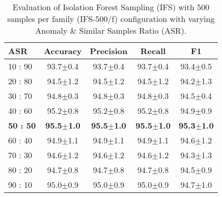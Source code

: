 
\begin{table*}[!ht]
\large
\def\arraystretch{1.1}

\centering

\caption{Evaluation of Isolation Forest Sampling (IFS) with 500 samples per family (IFS-500/f) configuration with varying Anomaly \& Similar Samples Ratio (ASR).}
\begin{tabular}{l|c|c|c|c} 

\hline
{\bf ASR} & {\bf Accuracy} & {\bf Precision} & {\bf Recall} & {\bf F1} \\   \hline \hline

10 : 90   & 93.7$\pm$0.4    & 93.7$\pm$0.4    & 93.7$\pm$0.4      & 93.4$\pm$0.5      \\
20 : 80   & 94.5$\pm$1.2     & 94.5$\pm$1.2   & 94.5$\pm$1.2      & 94.2$\pm$1.3      \\
30 : 70   &  94.8$\pm$0.3   & 94.8$\pm$0.3   & 94.8$\pm$0.3      & 94.5$\pm$0.4      \\
40 : 60   &  95.2$\pm$0.8   &  95.2$\pm$0.8  & 95.2$\pm$0.8      &  94.9$\pm$0.9     \\

{\bf 50 : 50 }  &  {\bf  95.5$\pm$1.0}  &  {\bf 95.5$\pm$1.0}  &  {\bf 95.5$\pm$1.0}     &  {\bf 95.3$\pm$1.0 }    \\

60 : 40   &  94.9$\pm$1.1   & 94.9$\pm$1.1   &  94.9$\pm$1.1     &  94.6$\pm$1.2     \\
70 : 30   &  94.6$\pm$1.2   & 94.6$\pm$1.2   &  94.6$\pm$1.2     &  94.3$\pm$1.3     \\
80 : 20   &  94.7$\pm$0.8   & 94.7$\pm$0.8   &  94.7$\pm$0.8     & 94.5$\pm$0.9      \\
90 : 10   &  95.0$\pm$0.9   & 95.0$\pm$0.9   &   95.0$\pm$0.9    &   94.7$\pm$1.0    \\

\hline

\end{tabular}

\label{tab:anomalyperct}
\end{table*}



